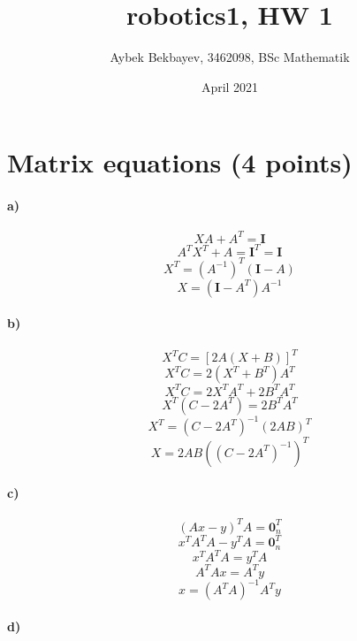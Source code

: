 \documentclass{article}
\title{robotics1, HW 1}
\author{Aybek Bekbayev, 3462098, BSc Mathematik }
\date{April 2021}
\begin{document}
\maketitle

\section{Matrix equations (4 points)}

\paragraph{a)}
    \begin{center}
        $$
            XA + A^{T} = \textbf{I} 
        $$
        $$   
            A^{T}X^{T}+A = \textbf{I}^{T} = \textbf{I} 
        $$    
        $$
            X^T = (A^{-1})^{T}(\textbf{I}-A) 
        $$
        $$
            X = (\textbf{I} - A^{T})A^{-1}
        $$ 
    \end{center}
\paragraph{b)}
\begin{center}
    $$
        X^{T}C=[2A(X+B)]^{T}
    $$
    $$
        X^{T}C = 2(X^{T} + B^{T})A^{T}  
    $$
    $$
        X^{T}C = 2X^{T}A^{T} + 2B^{T}A^{T}
    $$
    $$
        X^{T}(C-2A^{T}) = 2B^{T}A^{T}
    $$
    $$
        X^{T} = (C-2A^{T})^{-1}(2AB)^T
    $$
    $$
        X = 2AB((C-2A^{T})^{-1})^{T}
    $$
\end{center}
\paragraph{c)}
\begin{center}
    $$
        (Ax-y)^{T}A = \textbf{0}_{n}^{T}
    $$    
    $$
        x^{T}A^{T}A-y^{T}A = \textbf{0}^{T}_{n}
    $$
    $$
        x^{T}A^{T}A = y^{T}A
    $$
    $$
        A^{T}Ax = A^{T}y
    $$
    $$
        x = (A^{T}A)^{-1}A^{T}y
    $$
\end{center}
\paragraph{d)}
\begin{center}

\end{center}
\end{document}
